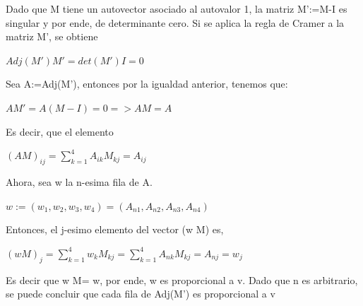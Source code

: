 \documentclass[12pt]{article}
\begin{document}
Dado que M tiene un autovector asociado al autovalor 1, la matriz M':=M-I es singular y por ende, de 
determinante cero.
Si se aplica la regla de Cramer a la matriz M', se obtiene
\begin{center}
$Adj(M')M' = det(M')I=0$
\end{center}
Sea A:=Adj(M'), entonces por la igualdad anterior, tenemos que:
\begin{center}
$AM'=A(M-I)=0 => AM=A$
\end{center}
Es decir, que el elemento 
\begin{center}
$(AM)_{ij}=\sum_{k=1}^4 A_{ik} M_{kj} = A_{ij}$
\end{center}
Ahora, sea w la n-esima fila de A.
\begin{center}
$w:=(w_1,w_2,w_3,w_4)=(A_{n1},A_{n2},A_{n3},A_{n4})$
\end{center}
Entonces, el j-esimo elemento del vector (w M) es,
\begin{center}
$(w M)_j=\sum_{k=1}^4 w_k M_{kj} =\sum_{k=1}^4 A_{nk} M_{kj} = A_{nj}=w_j$
\end{center}
Es decir que w M= w, por ende, w es proporcional a v.
Dado que n es arbitrario, se puede concluir que cada fila de Adj(M') es proporcional a v
\end{document}
